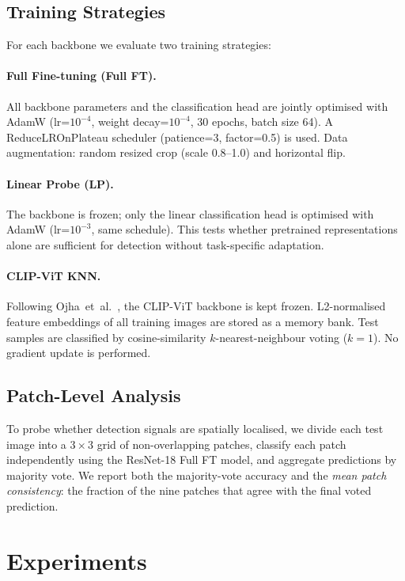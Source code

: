 \documentclass{article}
\begin{document}
\subsection{Training Strategies}

For each backbone we evaluate two training strategies:

\paragraph{Full Fine-tuning (Full FT).}
All backbone parameters and the classification head are jointly optimised with AdamW (lr=$10^{-4}$, weight decay=$10^{-4}$, 30 epochs, batch size 64).
A ReduceLROnPlateau scheduler (patience=3, factor=0.5) is used.
Data augmentation: random resized crop (scale 0.8--1.0) and horizontal flip.

\paragraph{Linear Probe (LP).}
The backbone is frozen; only the linear classification head is optimised with AdamW (lr=$10^{-3}$, same schedule).
This tests whether pretrained representations alone are sufficient for detection without task-specific adaptation.

\paragraph{CLIP-ViT KNN.}
Following Ojha~et~al.~\cite{ojha2023towards}, the CLIP-ViT backbone is kept frozen.
L2-normalised feature embeddings of all training images are stored as a memory bank.
Test samples are classified by cosine-similarity $k$-nearest-neighbour voting ($k=1$).
No gradient update is performed.

\subsection{Patch-Level Analysis}

To probe whether detection signals are spatially localised, we divide each test image into a $3 \times 3$ grid of non-overlapping patches, classify each patch independently using the ResNet-18 Full FT model, and aggregate predictions by majority vote.
We report both the majority-vote accuracy and the \emph{mean patch consistency}: the fraction of the nine patches that agree with the final voted prediction.


\section{Experiments}
\end{document}
